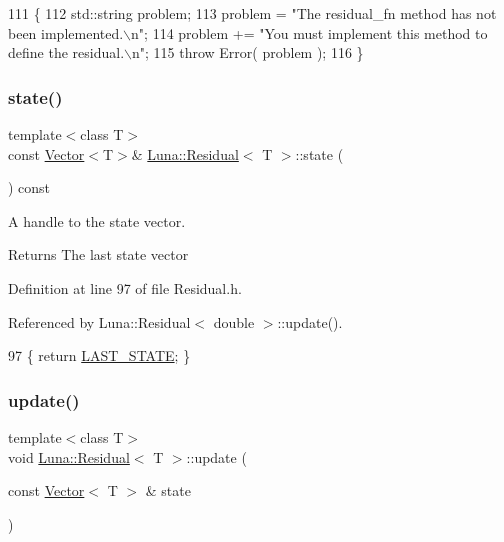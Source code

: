 \begin{DoxyCode}
111       \{
112         std::string problem;
113         problem = \textcolor{stringliteral}{"The residual\_fn method has not been implemented.\(\backslash\)n"};
114         problem += \textcolor{stringliteral}{"You must implement this method to define the residual.\(\backslash\)n"};
115         \textcolor{keywordflow}{throw} Error( problem );
116       \}
\end{DoxyCode}
\mbox{\label{classLuna_1_1Residual_a41d9f863aa529f16c5d78fb19b4906bd}} 
\subsubsection{\texorpdfstring{state()}{state()}}
{\footnotesize\ttfamily template$<$class T$>$ \\
const \hyperlink{classLuna_1_1Vector}{Vector}$<$T$>$\& \hyperlink{classLuna_1_1Residual}{Luna\+::\+Residual}$<$ T $>$\+::state (\begin{DoxyParamCaption}{ }\end{DoxyParamCaption}) const\hspace{0.3cm}{\ttfamily [inline]}}



A handle to the state vector. 

\begin{DoxyReturn}{Returns}
The last state vector 
\end{DoxyReturn}


Definition at line 97 of file Residual.\+h.



Referenced by Luna\+::\+Residual$<$ double $>$\+::update().


\begin{DoxyCode}
97 \{ \textcolor{keywordflow}{return} \hyperlink{classLuna_1_1Residual_abcfc99f00aa4cf3616b32dfd5315dece}{LAST\_STATE}; \}
\end{DoxyCode}
\mbox{\label{classLuna_1_1Residual_ac1f39e77c729e6a4a1e10ac951f6c704}} 
\subsubsection{\texorpdfstring{update()}{update()}}
{\footnotesize\ttfamily template$<$class T$>$ \\
void \hyperlink{classLuna_1_1Residual}{Luna\+::\+Residual}$<$ T $>$\+::update (\begin{DoxyParamCaption}\item[{const \hyperlink{classLuna_1_1Vector}{Vector}$<$ T $>$ \&}]{state }\end{DoxyParamCaption})\hspace{0.3cm}{\ttfamily [inline]}}



